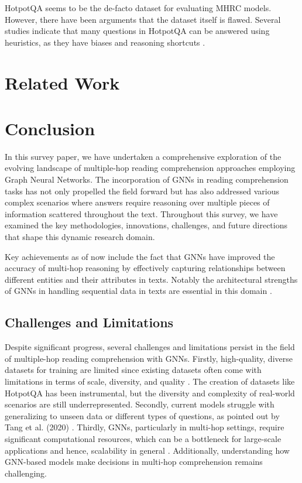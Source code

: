\documentclass[sigplan,screen]{acmart}
\begin{document}
HotpotQA seems to be the de-facto dataset for evaluating MHRC models. However, there have been arguments that the dataset itself is flawed. 
Several studies \cite{RN176} \cite{RN175} \cite{RN154} \cite{RN150} indicate that many questions in HotpotQA can be answered using heuristics, 
as they have biases and reasoning shortcuts \cite{RN177}.



\section{Related Work}

\section{Conclusion}
In this survey paper, we have undertaken a comprehensive exploration of the evolving landscape of multiple-hop reading comprehension approaches
employing Graph Neural Networks. The incorporation of GNNs in reading comprehension tasks has not only propelled the field forward but has 
also addressed various complex scenarios where answers require reasoning over multiple pieces of information scattered throughout the text. 
Throughout this survey, we have examined the key methodologies, innovations, challenges, and future directions that shape this dynamic research domain.

Key achievements as of now include the fact that GNNs have improved the accuracy of multi-hop reasoning by effectively capturing 
relationships between different entities and their attributes in texts. Notably the architectural strengths of GNNs in handling sequential data in texts
are essential in this domain \cite{RN23}. 

\subsection{Challenges and Limitations}
Despite significant progress, several challenges and limitations persist in the field of multiple-hop reading comprehension with GNNs.
Firstly, high-quality, diverse datasets for training are limited since existing datasets often come with limitations in terms of scale, 
diversity, and quality \cite{RN214}. The creation of datasets like HotpotQA has been instrumental, but the diversity and complexity of real-world 
scenarios are still underrepresented. Secondly, current models struggle with generalizing to unseen data or different types of questions, as pointed out by
Tang et al. (2020) \cite{RN215}. Thirdly, GNNs, particularly in multi-hop settings, require significant computational resources, 
which can be a bottleneck for large-scale applications and hence, scalability in general \cite{RN216}. Additionally, understanding how GNN-based models 
make decisions in multi-hop comprehension remains challenging.
\end{document}
